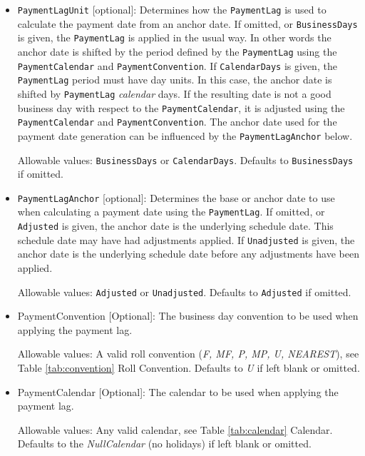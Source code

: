 \begin{itemize}
\begin{itemize}
  \item \lstinline!PaymentLagUnit! [optional]:
  Determines how the \lstinline!PaymentLag! is used to calculate the payment date from an anchor date.
  If omitted, or \lstinline!BusinessDays! is given, the \lstinline!PaymentLag! is applied in the usual way.
  In other words the anchor date is shifted by the period defined by the \lstinline!PaymentLag! using the 
  \lstinline!PaymentCalendar! and \lstinline!PaymentConvention!.
  If \lstinline!CalendarDays! is given, the \lstinline!PaymentLag! period must have day units.
  In this case, the anchor date is shifted by \lstinline!PaymentLag! \emph{calendar} days.
  If the resulting date is not a good business day with respect to the \lstinline!PaymentCalendar!,
  it is adjusted using the \lstinline!PaymentCalendar! and \lstinline!PaymentConvention!.
  The anchor date used for the payment date generation can be influenced by the \lstinline!PaymentLagAnchor! below.

  Allowable values: \lstinline!BusinessDays! or \lstinline!CalendarDays!.
  Defaults to \lstinline!BusinessDays! if omitted.

  \item \lstinline!PaymentLagAnchor! [optional]:
  Determines the base or anchor date to use when calculating a payment date using the \lstinline!PaymentLag!.
  If omitted, or \lstinline!Adjusted! is given, the anchor date is the underlying schedule date.
  This schedule date may have had adjustments applied.
  If \lstinline!Unadjusted! is given, the anchor date is the underlying schedule date 
  before any adjustments have been applied.

  Allowable values: \lstinline!Adjusted! or \lstinline!Unadjusted!. Defaults to \lstinline!Adjusted! if omitted.

  \item PaymentConvention [Optional]: The business day convention to be used when applying the payment lag.
  
    Allowable values: A valid roll convention (\emph{F, MF, P, MP, U, NEAREST}), see Table \ref{tab:convention} Roll Convention. Defaults to \emph{U} if left blank or omitted.
    
  \item PaymentCalendar [Optional]: The calendar to be used when applying the payment lag.
  
    Allowable values: Any valid calendar, see Table \ref{tab:calendar} Calendar. Defaults to the \emph{NullCalendar} (no holidays) if left blank or omitted.
    

\end{itemize}
\end{itemize}
